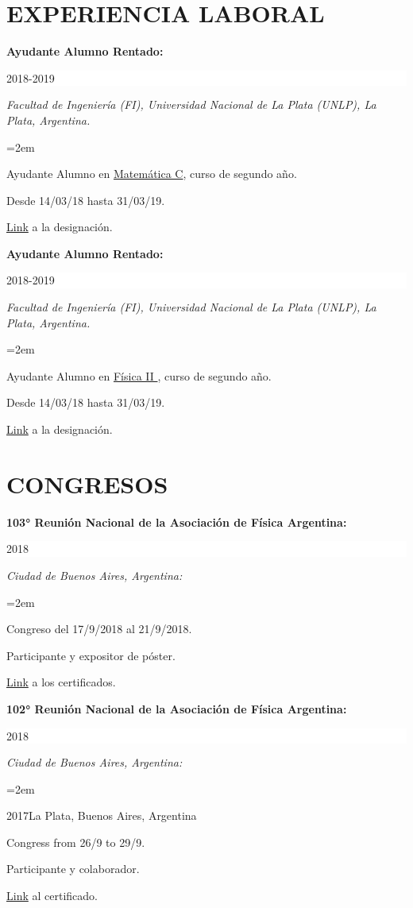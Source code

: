 \documentclass[paper=letter,fontsize=11pt]{scrartcl} %
\newcommand{\sepspace}{\vspace*{1em}}		%
\newcommand{\NewPart}[2]{\section*{\uppercase{#1} \small \normalfont #2}}
\newcommand{\WorkEntry}[5]{
		\noindent \textbf{#1}
        \noindent \small \textit{#2}
        \hfill      %
        \colorbox{White}{%
			\parbox{6em}{%
			\hfill\color{Black}#3}} \par  %
		\noindent \textit{#4} \par        %
		\noindent\hangindent=2em\hangafter=0 \small #5 %
		\normalsize \par}
\begin{document}
\NewPart{Experiencia Laboral}{}

\sepspace



\WorkEntry{Ayudante Alumno Rentado:}
{}{2018-2019}
{Facultad de Ingeniería (FI), Universidad Nacional de La Plata (UNLP), La Plata, Argentina.}
{

Ayudante Alumno en {\href{https://www.ing.unlp.edu.ar/catedras/F0304/}{Matemática C}}, curso de segundo año.

Desde 14/03/18 hasta 31/03/19.

{\href{https://drive.google.com/drive/folders/1v960J-ofrC-xrrzCB4wOwtd4gdpVOSZy?usp=sharing}{Link} a la designación.}
}

\sepspace

\WorkEntry{Ayudante Alumno Rentado:}
{}{2018-2019}
{Facultad de Ingeniería (FI), Universidad Nacional de La Plata (UNLP), La Plata, Argentina.}
{

Ayudante Alumno en {\href{https://www.ing.unlp.edu.ar/catedras/F0305/}{Física II  }}, curso de segundo año.

Desde 14/03/18 hasta 31/03/19.

\href{https://drive.google.com/drive/folders/1vABkaZMn7Y_dWg1AbqDlz4lgAiekRv09?usp=sharing}{Link} a la designación.
}

\sepspace



\NewPart{Congresos}{}

\sepspace

\WorkEntry{103°  Reunión Nacional de la Asociación de Física Argentina:}{}{2018}{Ciudad de Buenos Aires, Argentina:}{

Congreso del 17/9/2018 al 21/9/2018.

Participante y expositor de póster.

{\href{https://drive.google.com/drive/folders/1WnbBy38R2___5leniTvo4lFK3aMaCwk7?usp=sharing}{Link}} a los certificados.
}


\newpage

\WorkEntry{102°  Reunión Nacional de la Asociación de Física Argentina:}{}{2018}{Ciudad de Buenos Aires, Argentina:}{}{2017}{La Plata,  Buenos Aires, Argentina}{

Congress from 26/9 to 29/9.

Participante y colaborador.

{\href{https://drive.google.com/drive/folders/166mUi8z6QCz5kGK86sLKj27jQiXhEmrc?usp=sharing}{Link}} al certificado.
}
\end{document}
